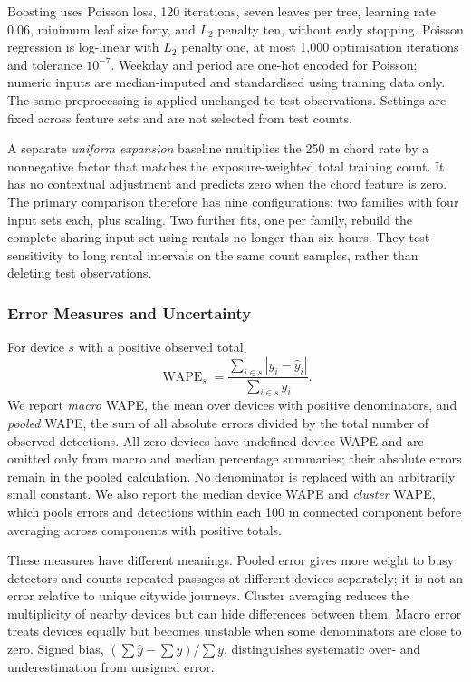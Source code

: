 \documentclass{interact}
\newcommand{\WAPE}{\operatorname{WAPE}}
\begin{document}
Boosting uses Poisson loss, 120 iterations, seven leaves per tree, learning rate 0.06, minimum leaf size forty, and $L_2$ penalty ten, without early stopping. Poisson regression is log-linear with $L_2$ penalty one, at most 1,000 optimisation iterations and tolerance $10^{-7}$. Weekday and period are one-hot encoded for Poisson; numeric inputs are median-imputed and standardised using training data only. The same preprocessing is applied unchanged to test observations. Settings are fixed across feature sets and are not selected from test counts.

A separate \emph{uniform expansion} baseline multiplies the 250 m chord rate by a nonnegative factor that matches the exposure-weighted total training count. It has no contextual adjustment and predicts zero when the chord feature is zero. The primary comparison therefore has nine configurations: two families with four input sets each, plus scaling. Two further fits, one per family, rebuild the complete sharing input set using rentals no longer than six hours. They test sensitivity to long rental intervals on the same count samples, rather than deleting test observations.

\subsubsection{Error Measures and Uncertainty}
For device $s$ with a positive observed total,
\begin{equation}
 \WAPE_s=\frac{\sum_{i\in s}|y_i-\widehat y_i|}{\sum_{i\in s}y_i}.
\end{equation}
We report \emph{macro} WAPE, the mean over devices with positive denominators, and \emph{pooled} WAPE, the sum of all absolute errors divided by the total number of observed detections. All-zero devices have undefined device WAPE and are omitted only from macro and median percentage summaries; their absolute errors remain in the pooled calculation. No denominator is replaced with an arbitrarily small constant. We also report the median device WAPE and \emph{cluster} WAPE, which pools errors and detections within each 100 m connected component before averaging across components with positive totals.

These measures have different meanings. Pooled error gives more weight to busy detectors and counts repeated passages at different devices separately; it is not an error relative to unique citywide journeys. Cluster averaging reduces the multiplicity of nearby devices but can hide differences between them. Macro error treats devices equally but becomes unstable when some denominators are close to zero. Signed bias, $(\sum\widehat y-\sum y)/\sum y$, distinguishes systematic over- and underestimation from unsigned error.
\end{document}

